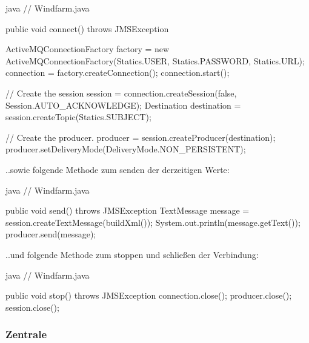 \begin{code}{java}
// Windfarm.java

public void connect() throws JMSException {
    ActiveMQConnectionFactory factory = new ActiveMQConnectionFactory(Statics.USER, Statics.PASSWORD, Statics.URL);
    connection = factory.createConnection();
    connection.start();

    // Create the session
    session = connection.createSession(false, Session.AUTO_ACKNOWLEDGE);
    Destination destination = session.createTopic(Statics.SUBJECT);

    // Create the producer.
    producer = session.createProducer(destination);
    producer.setDeliveryMode(DeliveryMode.NON_PERSISTENT);
}
\end{code}

..sowie folgende Methode zum senden der derzeitigen Werte:

\begin{code}{java}
// Windfarm.java

public void send() throws JMSException {
    TextMessage message = session.createTextMessage(buildXml());
    System.out.println(message.getText());
    producer.send(message);
}
\end{code}

..und folgende Methode zum stoppen und schließen der Verbindung:

\begin{code}{java}
// Windfarm.java

public void stop() throws JMSException {
    connection.close();
    producer.close();
    session.close();
}
\end{code}

\subsubsection{Zentrale}
\label{sec:headquarters}
